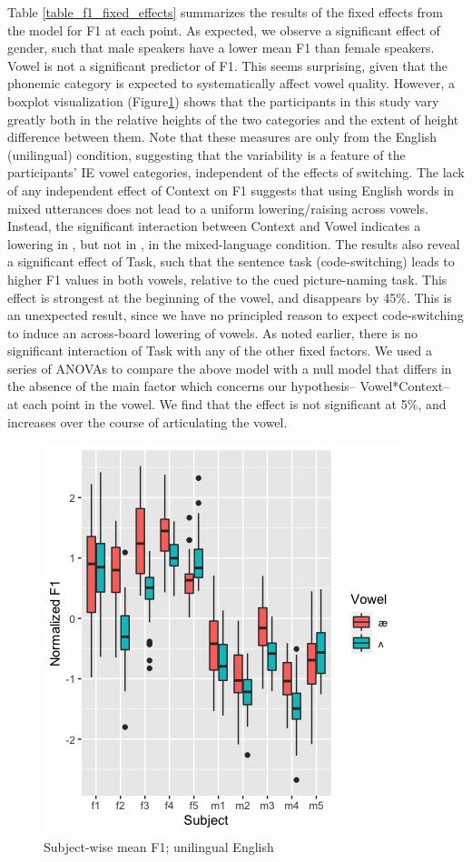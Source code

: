 \documentclass[charis,linguex]{glossa}
\newcommand{\nt}[1]{\textipa{[#1]}} %
\begin{document}
Table \ref{table_f1_fixed_effects} summarizes the results of the fixed effects from the model for F1 at each point. As expected, we observe a significant effect of gender, such that male speakers have a lower mean F1 than female speakers. Vowel is not a significant predictor of F1. This seems surprising, given that the phonemic category is expected to systematically affect vowel quality. However, a boxplot visualization (Figure\ref{boxplot_F1}) shows that the participants in this study vary greatly both in the relative heights of the two categories and the extent of height difference between them. Note that these measures are only from the English (unilingual) condition, suggesting that the variability is a feature of the participants' IE vowel categories, independent of the effects of switching. The lack of any independent effect of Context on F1 suggests that using English words in mixed utterances does not lead to a uniform lowering/raising across vowels. Instead, the significant interaction between Context and Vowel indicates a lowering in \nt{2}, but not in \nt{\ae}, in the mixed-language condition. The results also reveal a significant effect of Task, such that the sentence task (code-switching) leads to higher F1 values in both vowels, relative to the cued picture-naming task. This effect is strongest at the beginning of the vowel, and disappears by 45\%. This is an unexpected result, since we have no principled reason to expect code-switching to induce an across-board lowering of vowels. As noted earlier, there is no significant interaction of Task with any of the other fixed factors. We used a series of ANOVAs to compare the above model with a null model that differs in the absence of the main factor which concerns our hypothesis-- Vowel*Context-- at each point in the vowel. We find that the effect is not significant at 5\%, and increases over the course of articulating the vowel. 


\begin{figure}
	
	\includegraphics[scale=0.8]{vowel_by_subject_ggplot}
	\caption{Subject-wise mean F1; unilingual English}
	\label{boxplot_F1}
\end{figure}
\end{document}
